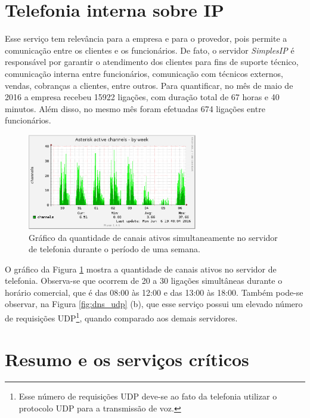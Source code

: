 \section{Telefonia interna sobre IP}
\label{section:telefonia}

Esse serviço tem relevância para a empresa e para o provedor, pois permite a comunicação entre os clientes e os funcionários. De fato, o 
servidor \textit{SimplesIP} é responsável por garantir o atendimento dos clientes para fins de suporte técnico, comunicação interna entre 
funcionários, comunicação com técnicos externos, vendas, cobranças a clientes, entre outros. Para quantificar, no mês de maio de 2016 a empresa 
recebeu 15922 ligações, com duração total de 67 horas e 40 minutos. Além disso, no mesmo mês foram efetuadas 674 ligações entre funcionários. 

\begin{figure}[h!]
 \centering
 \includegraphics[width=280px]{img/simplesip_week.eps}
 \caption{Gráfico da quantidade de canais ativos simultaneamente no servidor de telefonia durante o período de uma semana.}
 \label{fig:simplesip_week}
\end{figure}

O gráfico da Figura \ref{fig:simplesip_week} mostra a quantidade de canais ativos no servidor de telefonia. Observa-se que ocorrem 
de 20 a 30 ligações simultâneas durante o horário comercial, que é das 08:00 às 12:00 e das 13:00 às 18:00. Também pode-se observar, na Figura 
\ref{fig:dns_udp} (b), que esse serviço possui um elevado número de requisições \ac{UDP}\footnote[1]{Esse número de requisições \ac{UDP} 
deve-se ao fato da telefonia utilizar o protocolo \ac{UDP} para a transmissão de voz.}, quando comparado aos demais servidores.

\section{Resumo e os serviços críticos}
\label{section:maqservcrit}


